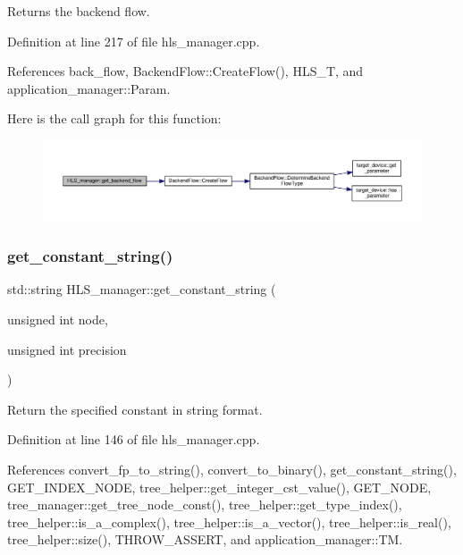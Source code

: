 Returns the backend flow. 



Definition at line 217 of file hls\+\_\+manager.\+cpp.



References back\+\_\+flow, Backend\+Flow\+::\+Create\+Flow(), H\+L\+S\+\_\+T, and application\+\_\+manager\+::\+Param.

Here is the call graph for this function\+:
\nopagebreak
\begin{figure}[H]
\begin{center}
\leavevmode
\includegraphics[width=350pt]{dc/dd7/classHLS__manager_aff13fa7f6ea495bbb5979294d336edb5_cgraph}
\end{center}
\end{figure}
\mbox{\label{classHLS__manager_adb55871297598407cb473ef10647048b}} 
\subsubsection{\texorpdfstring{get\+\_\+constant\+\_\+string()}{get\_constant\_string()}}
{\footnotesize\ttfamily std\+::string H\+L\+S\+\_\+manager\+::get\+\_\+constant\+\_\+string (\begin{DoxyParamCaption}\item[{unsigned int}]{node,  }\item[{unsigned int}]{precision }\end{DoxyParamCaption})}



Return the specified constant in string format. 



Definition at line 146 of file hls\+\_\+manager.\+cpp.



References convert\+\_\+fp\+\_\+to\+\_\+string(), convert\+\_\+to\+\_\+binary(), get\+\_\+constant\+\_\+string(), G\+E\+T\+\_\+\+I\+N\+D\+E\+X\+\_\+\+N\+O\+DE, tree\+\_\+helper\+::get\+\_\+integer\+\_\+cst\+\_\+value(), G\+E\+T\+\_\+\+N\+O\+DE, tree\+\_\+manager\+::get\+\_\+tree\+\_\+node\+\_\+const(), tree\+\_\+helper\+::get\+\_\+type\+\_\+index(), tree\+\_\+helper\+::is\+\_\+a\+\_\+complex(), tree\+\_\+helper\+::is\+\_\+a\+\_\+vector(), tree\+\_\+helper\+::is\+\_\+real(), tree\+\_\+helper\+::size(), T\+H\+R\+O\+W\+\_\+\+A\+S\+S\+E\+RT, and application\+\_\+manager\+::\+TM.



